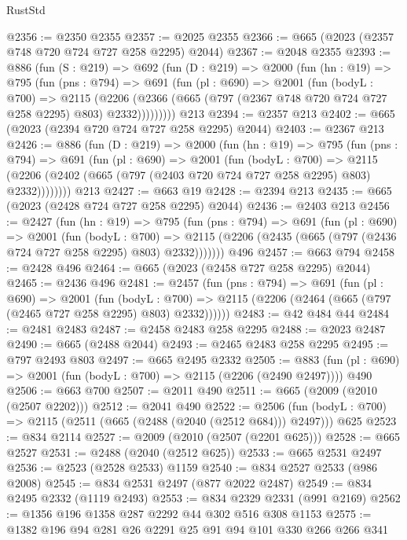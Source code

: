 \begin{lexlean}{RustStd}
\begin{coremodule}
{\begin{coremodule}
{{{{{{{@2356 := @2350 @2355
@2357 := @2025 @2355
@2366 := @665 (@2023 (@2357 @748 @720 @724 @727 @258 @2295) @2044)
@2367 := @2048 @2355
@2393 := @886
    (fun (S : @219) =>
    @692
      (fun (D : @219) =>
      @2000
        (fun (hn : @19) =>
        @795
          (fun (pns : @794) =>
          @691
            (fun (pl : @690) =>
            @2001
              (fun (bodyL : @700) =>
              @2115
                (@2206
                  (@2366 (@665 (@797 (@2367 @748 @720 @724 @727 @258 @2295) @803) @2332)))))))))
    @213
@2394 := @2357 @213
@2402 := @665 (@2023 (@2394 @720 @724 @727 @258 @2295) @2044)
@2403 := @2367 @213
@2426 := @886
    (fun (D : @219) =>
    @2000
      (fun (hn : @19) =>
      @795
        (fun (pns : @794) =>
        @691
          (fun (pl : @690) =>
          @2001
            (fun (bodyL : @700) =>
            @2115 (@2206 (@2402 (@665 (@797 (@2403 @720 @724 @727 @258 @2295) @803) @2332))))))))
    @213
@2427 := @663 @19
@2428 := @2394 @213
@2435 := @665 (@2023 (@2428 @724 @727 @258 @2295) @2044)
@2436 := @2403 @213
@2456 := @2427
    (fun (hn : @19) =>
    @795
      (fun (pns : @794) =>
      @691
        (fun (pl : @690) =>
        @2001
          (fun (bodyL : @700) =>
          @2115 (@2206 (@2435 (@665 (@797 (@2436 @724 @727 @258 @2295) @803) @2332)))))))
    @496
@2457 := @663 @794
@2458 := @2428 @496
@2464 := @665 (@2023 (@2458 @727 @258 @2295) @2044)
@2465 := @2436 @496
@2481 := @2457
    (fun (pns : @794) =>
    @691
      (fun (pl : @690) =>
      @2001
        (fun (bodyL : @700) =>
        @2115 (@2206 (@2464 (@665 (@797 (@2465 @727 @258 @2295) @803) @2332))))))
@2483 := @42 @484 @44
@2484 := @2481 @2483
@2487 := @2458 @2483 @258 @2295
@2488 := @2023 @2487
@2490 := @665 (@2488 @2044)
@2493 := @2465 @2483 @258 @2295
@2495 := @797 @2493 @803
@2497 := @665 @2495 @2332
@2505 := @883 (fun (pl : @690) => @2001 (fun (bodyL : @700) => @2115 (@2206 (@2490 @2497)))) @490
@2506 := @663 @700
@2507 := @2011 @490
@2511 := @665 (@2009 (@2010 (@2507 @2202)))
@2512 := @2041 @490
@2522 := @2506 (fun (bodyL : @700) => @2115 (@2511 (@665 (@2488 (@2040 (@2512 @684))) @2497))) @625
@2523 := @834 @2114
@2527 := @2009 (@2010 (@2507 (@2201 @625)))
@2528 := @665 @2527
@2531 := @2488 (@2040 (@2512 @625))
@2533 := @665 @2531 @2497
@2536 := @2523 (@2528 @2533) @1159
@2540 := @834 @2527 @2533 (@986 @2008)
@2545 := @834 @2531 @2497 (@877 @2022 @2487)
@2549 := @834 @2495 @2332 (@1119 @2493)
@2553 := @834 @2329 @2331 (@991 @2169)
@2562 := @1356 @196 @1358 @287 @2292 @44 @302 @516 @308 @1153
@2575 := @1382 @196 @94 @281 @26 @2291 @25 @91 @94 @101 @330 @266 @266 @341
}}}}}}}
\end{coremodule}}
\end{coremodule}
\end{lexlean}
